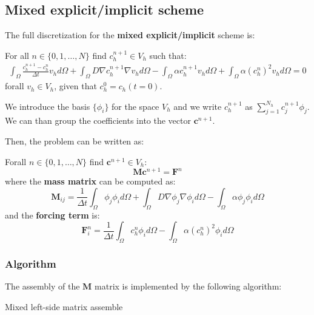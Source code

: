 \documentclass[12pt, letterpaper]{article}
\begin{document}
\pagebreak
\subsection{Mixed explicit/implicit scheme}
The full discretization for the \textbf{mixed explicit/implicit} scheme is:

\vspace{1em}
\noindent
For all $n\in\{0,1,\dots,N\}$ find $c_h^{n+1}\in V_h$ such that:
\begin{gather}
\int_\Omega\frac{c_h^{n+1}-c_h^{n}}{\Delta t}v_hd\Omega+\int_\Omega D\nabla c_h^{n+1}\nabla v_hd\Omega-\int_\Omega\alpha c_h^{n+1}v_hd\Omega+\int_\Omega\alpha (c_h^n)^2 v_h d\Omega=0
\end{gather}
\noindent forall $v_h\in V_h$, given that $c_h^0=c_h(t=0)$.

\noindent We introduce the basis $\{\phi_i\}$ for the space $V_h$ and we write $c_h^{n+1}$ as $\sum_{j=1}^{N_h}c^{n+1}_j\phi_j$. We can than group the coefficients into the vector $\mathbf{c}^{n+1}$.

\noindent Then, the problem can be written as:

\vspace{1em}
\noindent
\noindent
Forall $n\in\{0,1,\dots,N\}$ find $\mathbf{c}^{n+1}\in V_h$:
$$\mathbf{M}\mathbf{c}^{n+1}=\mathbf{F}^n$$
where the \textbf{mass matrix} can be computed as:
$$\mathbf{M}_{ij}=\frac1{\Delta t}\int_\Omega\phi_j\phi_i d\Omega+\int_\Omega D\nabla \phi_j\nabla \phi_id\Omega-\int_\Omega\alpha \phi_j\phi_id\Omega$$
and the \textbf{forcing term} is:
$$\mathbf{F}_i^n=\frac1{\Delta t}\int_\Omega c_h^n\phi_i d\Omega-\int_\Omega\alpha (c_h^n)^2\phi_id\Omega$$

\subsubsection{Algorithm}
The assembly of the $\mathbf{M}$ matrix is implemented by the following algorithm:

\begin{algorithm}[H]
    \caption{Mixed left-side matrix assemble}

\end{algorithm}
\end{document}
